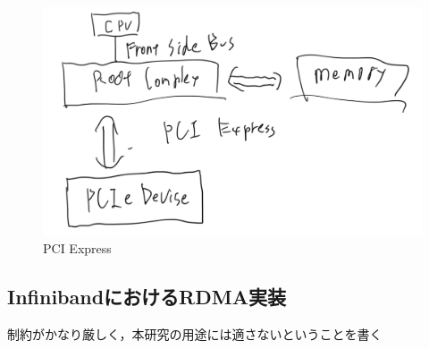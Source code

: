 \begin{figure}[htbp]
    \caption{PCI Express}
    \label{fig:zentai}
    \begin{center}
        \includegraphics[bb=0 0 1000 400,width=15cm]{img/tegaki/pcie.png}
    \end{center}
\end{figure}

\subsection{InfinibandにおけるRDMA実装}

制約がかなり厳しく，本研究の用途には適さないということを書く
